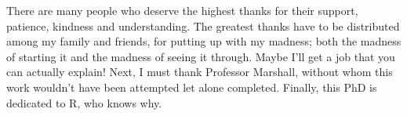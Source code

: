 There are many people who deserve the highest thanks for their support, patience, kindness and understanding.
The greatest thanks have to be distributed among my family and friends, for putting up with my madness; both the madness of starting it and the madness of seeing it through.
Maybe I'll get a job that you can actually explain! 
Next, I must thank Professor Marshall, without whom this work wouldn't have been attempted let alone completed.
Finally, this PhD is dedicated to R, who knows why.
